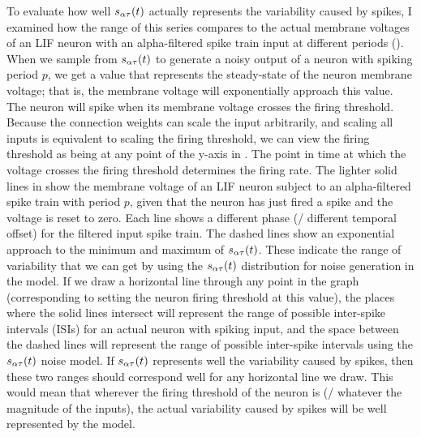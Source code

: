 To evaluate how well $s_{\alpha\tau}(t)$ actually represents
the variability caused by spikes,
I examined how the range of this series compares to
the actual membrane voltages of an LIF neuron with an
alpha-filtered spike train input at different periods ().
When we sample from $s_{\alpha\tau}(t)$ to generate a noisy output of a neuron
with spiking period $p$,
we get a value that represents the steady-state of the neuron membrane voltage;
that is, the membrane voltage will exponentially approach this value.
The neuron will spike when its membrane voltage crosses the firing threshold.
Because the connection weights can scale the input arbitrarily,
and scaling all inputs is equivalent to scaling the firing threshold,
we can view the firing threshold as being at any point of the y-axis
in .
The point in time at which the voltage crosses the firing threshold
determines the firing rate.
The lighter solid lines in  show the membrane voltage
of an LIF neuron subject to an alpha-filtered spike train with period $p$,
given that the neuron has just fired a spike and the voltage is reset to zero.
Each line shows a different phase (\ie/ different temporal offset)
for the filtered input spike train.
The dashed lines show an exponential approach
to the minimum and maximum of $s_{\alpha\tau}(t)$.
These indicate the range of variability that we can get
by using the $s_{\alpha\tau}(t)$ distribution for noise generation in the model.
If we draw a horizontal line through any point in the graph
(corresponding to setting the neuron firing threshold at this value),
the places where the solid lines intersect will represent the range
of possible inter-spike intervals (ISIs) for an actual neuron with spiking input,
and the space between the dashed lines will represent the range
of possible inter-spike intervals using the $s_{\alpha\tau}(t)$ noise model.
If $s_{\alpha\tau}(t)$ represents well the variability caused by spikes,
then these two ranges should correspond well for any horizontal line we draw.
This would mean that wherever the firing threshold of the neuron is
(\ie/ whatever the magnitude of the inputs),
the actual variability caused by spikes will be well represented by the model.

